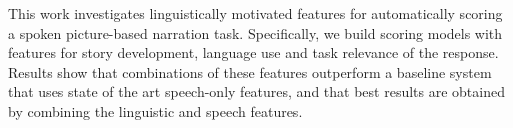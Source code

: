 This work investigates linguistically motivated features for automatically scoring a spoken picture-based narration task. Specifically, we  build scoring models with features for story development, language use and  task relevance of the response. Results show that combinations of these features outperform a baseline system that uses state of the art speech-only features, and that best results are obtained by combining the linguistic and speech features.
